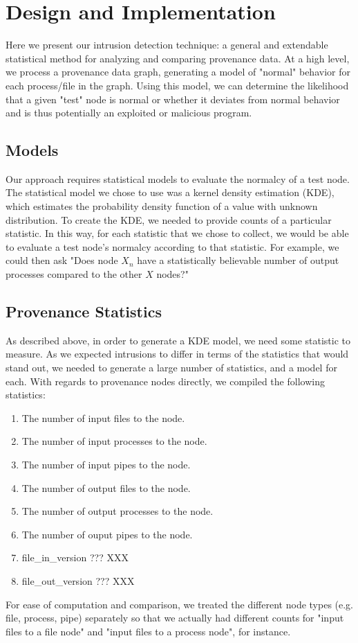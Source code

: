 \documentclass[10pt,twocolumn]{article}
\begin{document}
%

\section{Design and Implementation}
Here we present our intrusion detection technique: a general and extendable statistical method for analyzing and comparing provenance data. At a high level, we process a provenance data graph, generating a model of "normal" behavior for each process/file in the graph. Using this model, we can determine the likelihood that a given "test" node is normal or whether it deviates from normal behavior and is thus potentially an exploited or malicious program.
\subsection{Models}
Our approach requires statistical models to evaluate the normalcy of a test node. The statistical model we chose to use was a kernel density estimation (KDE), which estimates the probability density function of a value with unknown distribution. To create the KDE, we needed to provide counts of a particular statistic. In this way, for each statistic that we chose to collect, we would be able to evaluate a test node's normalcy according to that statistic. For example, we could then ask "Does node $X_n$ have a statistically believable number of output processes compared to the other $X$ nodes?"
\subsection{Provenance Statistics}
As described above, in order to generate a KDE model, we need some statistic to measure. As we expected intrusions to differ in terms of the statistics that would stand out, we needed to generate a large number of statistics, and a model for each. With regards to provenance nodes directly, we compiled the following statistics:
\begin{enumerate}
\item The number of input files to the node.
\item The number of input processes to the node.
\item The number of input pipes to the node.
\item The number of output files to the node.
\item The number of output processes to the node.
\item The number of ouput pipes to the node.
\item file\_in\_version ??? XXX
\item file\_out\_version ??? XXX
\end{enumerate}
For ease of computation and comparison, we treated the different node types (e.g. file, process, pipe) separately so that we actually had different counts for "input files to a file node" and "input files to a process node", for instance.
\end{document}
